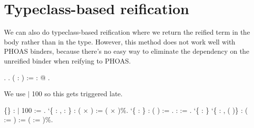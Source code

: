 \begin{coqdoccode}
\end{coqdoccode}
\section{Typeclass-based reification}

 We can also do typeclass-based reification where we return the
    reified term in the body rather than in the type.  However, this
    method does not work well with PHOAS binders, because there's no
    easy way to eliminate the dependency on the unreified binder when
    reifying to PHOAS. \begin{coqdoccode}
\coqdocemptyline
\coqdocnoindent
{}  .\coqdoceol
\coqdocemptyline
\coqdocnoindent
{}        .\coqdoceol
\coqdocnoindent
{}  ( : ) :=  : @ .\coqdoceol
\coqdocemptyline
\end{coqdoccode}
We use \ensuremath{|} 100 so this gets triggered late. \begin{coqdoccode}
\coqdocemptyline
\coqdocnoindent
{}  \{\} :   \ensuremath{|} 100 :=  .\coqdoceol
\coqdocnoindent
{}  `\{ :  ,  :  \}\coqdoceol
\coqdocindent{1.00em}
:  ( \ensuremath{\times} ) := ( \ensuremath{\times} )\%.\coqdoceol
\coqdocnoindent
{}  `\{ :  \}\coqdoceol
\coqdocindent{1.00em}
:  ( ) :=  .\coqdoceol
\coqdocnoindent
{} \coqdoceol
\coqdocindent{1.00em}
:   := .\coqdoceol
\coqdocnoindent
{}  `\{ :  \}\coqdoceol
\coqdocindent{3.50em}
`\{ : \coqdockw{\ensuremath{\forall}} ,  ( )\}\coqdoceol
\coqdocindent{1.00em}
:  (  :=    ) := (  :=    )\%.\coqdoceol
\coqdocemptyline
\end{coqdoccode}
